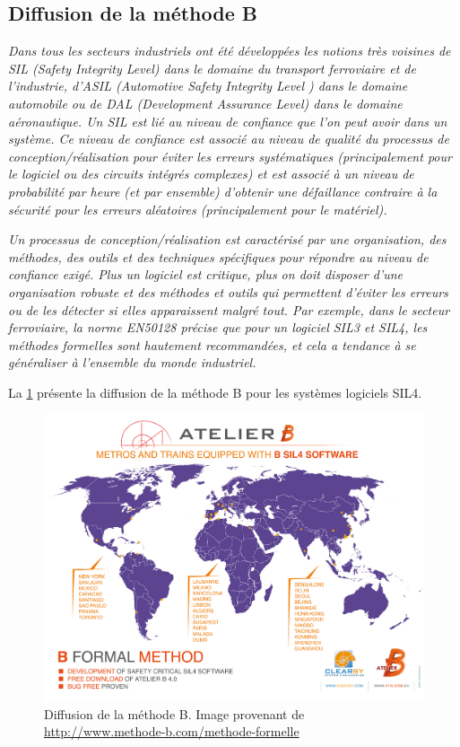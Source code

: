 \documentclass[10pt,a4paper]{article}
\begin{document}
{\subsection{Diffusion de la méthode B}
\emph{Dans tous les secteurs industriels ont été développées les notions très voisines de SIL (Safety Integrity Level) dans le domaine du transport ferroviaire et de l’industrie, d’ASIL (Automotive Safety Integrity Level ) dans le domaine automobile ou de DAL (Development Assurance Level) dans le domaine aéronautique. Un SIL est lié au niveau de confiance que l'on peut avoir dans un système. Ce niveau de confiance est associé au niveau de qualité du processus de conception/réalisation pour éviter les erreurs systématiques (principalement pour le logiciel ou des circuits intégrés complexes) et est associé à un niveau de probabilité par heure (et par ensemble) d'obtenir une défaillance contraire à la sécurité pour les erreurs aléatoires (principalement pour le matériel).}\cite{dossierTechnique}

\emph{Un processus de conception/réalisation est caractérisé par une organisation, des méthodes, des outils et des techniques spécifiques pour répondre au niveau de confiance exigé. Plus un logiciel est critique, plus on doit disposer d'une organisation robuste et des méthodes et outils qui permettent d'éviter les erreurs ou de les détecter si elles apparaissent malgré tout. Par exemple, dans le secteur ferroviaire, la norme EN50128 précise que pour un logiciel SIL3 et SIL4, les méthodes formelles sont hautement recommandées, et cela a tendance à se généraliser à l'ensemble du monde industriel.}\cite{dossierTechnique}

La \cref{UtilisationB} présente la diffusion de la méthode B pour les systèmes logiciels SIL4.
\begin{figure}[h]
\centering
\includegraphics[scale=0.23]{ressources/carte-monde-projets-b.jpg}
\caption{\label{UtilisationB}Diffusion de la méthode B. Image provenant de \url{http://www.methode-b.com/methode-formelle}}
\end{figure}



}
\end{document}
